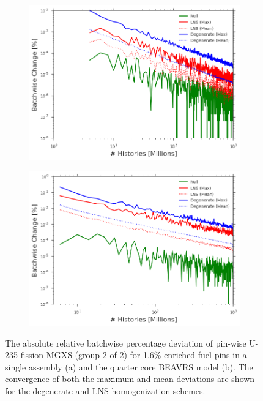 \begin{figure}[h!]
\centering
\begin{subfigure}{.87\textwidth}
  \centering
  \includegraphics[width=\linewidth]{figures/patterns/convergence/assm-16/assm-16-dev-fission-2}
  \caption{}
  \label{fig:chap9-assm-16-dev-fiss-2}
\end{subfigure}
\begin{subfigure}{.87\textwidth}
  \centering
  \includegraphics[width=\linewidth]{figures/patterns/convergence/full-core/16-enr-dev-fission-2}
  \caption{}
  \label{fig:chap9-full-core-dev-fiss-2}
\end{subfigure}
\caption[Convergence of U-235 fission MGXS batchwise deviation]{The absolute relative batchwise percentage deviation of pin-wise U-235 fission \ac{MGXS} (group 2 of 2) for 1.6\% enriched fuel pins in a single assembly (a) and the quarter core \ac{BEAVRS} model (b). The convergence of both the maximum and mean  deviations are shown for the degenerate and \ac{LNS} homogenization schemes.}
\label{fig:chap9-fiss-2-dev}
\end{figure}

